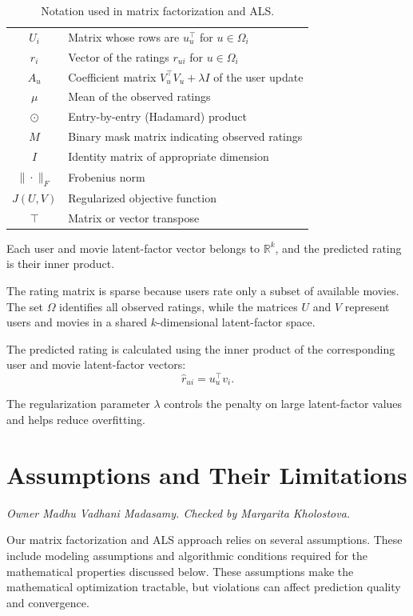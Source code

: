 \begin{table}[h]
\begin{tabular}{|c|l|}
$U_i$ & Matrix whose rows are $u_u^\top$ for $u\in\Omega_i$ \\
$r_i$ & Vector of the ratings $r_{ui}$ for $u\in\Omega_i$ \\
$A_u$ & Coefficient matrix $V_u^\top V_u+\lambda I$ of the user update \\
$\mu$ & Mean of the observed ratings \\
$\odot$ & Entry-by-entry (Hadamard) product \\
$M$ & Binary mask matrix indicating observed ratings \\
$I$ & Identity matrix of appropriate dimension \\
$\|\cdot\|_F$ & Frobenius norm \\
$J(U,V)$ & Regularized objective function \\
$\top$ & Matrix or vector transpose \\
\hline
\end{tabular}
\caption{Notation used in matrix factorization and ALS.}
\label{tab:notation}
\end{table}

Each user and movie latent-factor vector belongs to
$\mathbb{R}^k$, and the predicted rating is their inner product.

The rating matrix is sparse because users rate only a subset
of available movies. The set $\Omega$ identifies all observed
ratings, while the matrices $U$ and $V$ represent users and
movies in a shared $k$-dimensional latent-factor space.

The predicted rating is calculated using the inner product
of the corresponding user and movie latent-factor vectors:
\[
\hat r_{ui} = u_u^\top v_i.
\]

The regularization parameter $\lambda$ controls the penalty
on large latent-factor values and helps reduce overfitting.

\section{Assumptions and Their Limitations}
\textit{Owner Madhu Vadhani Madasamy. Checked by Margarita Kholostova.}


Our matrix factorization and ALS approach relies on several
assumptions. These include modeling assumptions and
algorithmic conditions required for the mathematical
properties discussed below. These assumptions make the mathematical
optimization tractable, but violations can affect prediction
quality and convergence.


